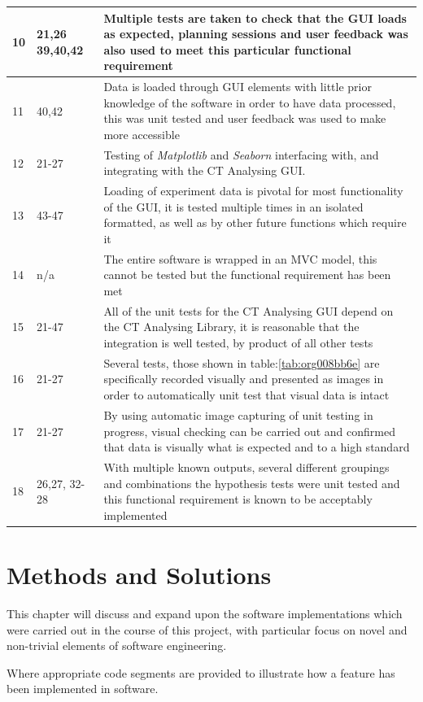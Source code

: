 \documentclass[11pt]{report}
\begin{document}
\begin{longtable}{|l|l|p{14cm}|}
\hline
10 & 21,26 39,40,42 & Multiple tests are taken to check that the GUI loads as expected, planning sessions and user feedback was also used to meet this particular functional requirement\\
\hline
11 & 40,42 & Data is loaded through GUI elements with little prior knowledge of the software in order to have data processed, this was unit tested and user feedback was used to make more accessible\\
\hline
12 & 21-27 & Testing of \emph{Matplotlib} and \emph{Seaborn} interfacing with, and integrating with the CT Analysing GUI.\\
\hline
13 & 43-47 & Loading of experiment data is pivotal for most functionality of the GUI, it is tested multiple times in an isolated formatted, as well as by other future functions which require it\\
\hline
14 & n/a & The entire software is wrapped in an MVC model, this cannot be tested but the functional requirement has been met\\
\hline
15 & 21-47 & All of the unit tests for the CT Analysing GUI depend on the CT Analysing Library, it is reasonable that the integration is well tested, by product of all other tests\\
\hline
16 & 21-27 & Several tests, those shown in table:\ref{tab:org008bb6e} are specifically recorded visually and presented as images in order to automatically unit test that visual data is intact\\
\hline
17 & 21-27 & By using automatic image capturing of unit testing in progress, visual checking can be carried out and confirmed that data is visually what is expected and to a high standard\\
\hline
18 & 26,27, 32-28 & With multiple known outputs, several different groupings and combinations the hypothesis tests were unit tested and this functional requirement is known to be acceptably implemented\\
\hline
\end{longtable}

\chapter{Methods and Solutions}
\label{sec:orge07b38a}
This chapter will discuss and expand upon the software implementations which were carried out in the course of this project, with particular focus on novel and non-trivial elements of software engineering.

Where appropriate code segments are provided to illustrate how a feature has been implemented in software.
\end{document}
